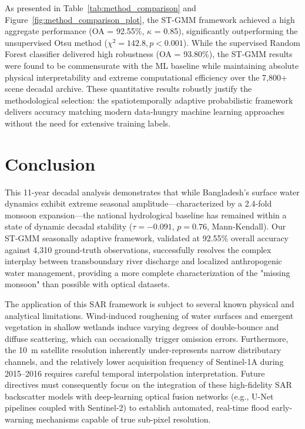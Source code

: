 \documentclass[fleqn,10pt,twocolumn]{article}
\begin{document}
As presented in Table~\ref{tab:method_comparison} and Figure~\ref{fig:method_comparison_plot}, the ST-GMM framework achieved a high aggregate performance (OA = 92.55\%, $\kappa$ = 0.85), significantly outperforming the unsupervised Otsu method ($\chi^2 = 142.8, p < 0.001$). While the supervised Random Forest classifier delivered high robustness (OA = 93.80\%), the ST-GMM results were found to be commensurate with the ML baseline while maintaining absolute physical interpretability and extreme computational efficiency over the 7,800+ scene decadal archive. These quantitative results robustly justify the methodological selection: the spatiotemporally adaptive probabilistic framework delivers accuracy matching modern data-hungry machine learning approaches without the need for extensive training labels.

\section{Conclusion}

This 11-year decadal analysis demonstrates that while Bangladesh's surface water dynamics exhibit extreme seasonal amplitude---characterized by a 2.4-fold monsoon expansion---the national hydrological baseline has remained within a state of dynamic decadal stability ($\tau = -0.091$, $p = 0.76$, Mann-Kendall). Our ST-GMM seasonally adaptive framework, validated at 92.55\% overall accuracy against 4,310 ground-truth observations, successfully resolves the complex interplay between transboundary river discharge and localized anthropogenic water management, providing a more complete characterization of the "missing monsoon" than possible with optical datasets. 

The application of this SAR framework is subject to several known physical and analytical limitations. Wind-induced roughening of water surfaces and emergent vegetation in shallow wetlands induce varying degrees of double-bounce and diffuse scattering, which can occasionally trigger omission errors. Furthermore, the 10~m satellite resolution inherently under-represents narrow distributary channels, and the relatively lower acquisition frequency of Sentinel-1A during 2015--2016 requires careful temporal interpolation interpretation. Future directives must consequently focus on the integration of these high-fidelity SAR backscatter models with deep-learning optical fusion networks (e.g., U-Net pipelines coupled with Sentinel-2) to establish automated, real-time flood early-warning mechanisms capable of true sub-pixel resolution. 
\end{document}
